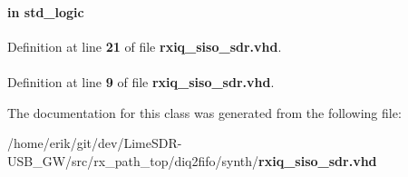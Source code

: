 \paragraph[{reset\+\_\+n}]{ {\bfseries \textcolor{keywordflow}{in}\textcolor{vhdlchar}{ }} {\bfseries \textcolor{comment}{std\+\_\+logic}\textcolor{vhdlchar}{ }} \hspace{0.3cm}{\ttfamily [Port]}}\label{classrxiq__siso__sdr_a446ea52ed8c4a84181a47d9165ce41a5}


Definition at line {\bf 21} of file {\bf rxiq\+\_\+siso\+\_\+sdr.\+vhd}.

\paragraph[{std\+\_\+logic\+\_\+1164}]{\hspace{0.3cm}{\ttfamily [Package]}}\label{classrxiq__siso__sdr_acd03516902501cd1c7296a98e22c6fcb}


Definition at line {\bf 9} of file {\bf rxiq\+\_\+siso\+\_\+sdr.\+vhd}.



The documentation for this class was generated from the following file\+:\begin{DoxyCompactItemize}
\item 
/home/erik/git/dev/\+Lime\+S\+D\+R-\/\+U\+S\+B\+\_\+\+G\+W/src/rx\+\_\+path\+\_\+top/diq2fifo/synth/{\bf rxiq\+\_\+siso\+\_\+sdr.\+vhd}\end{DoxyCompactItemize}
